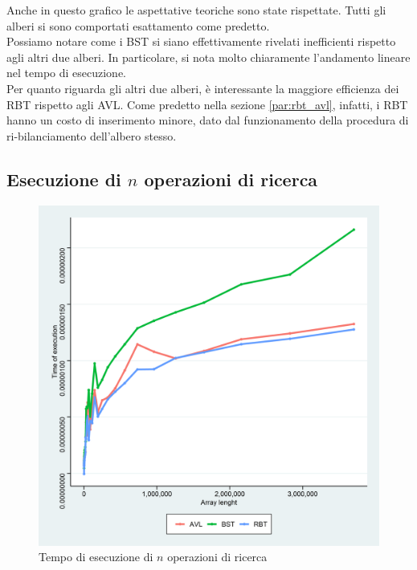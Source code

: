 \documentclass{article}
\begin{document}
	Anche in questo grafico le aspettative teoriche sono state rispettate. Tutti gli alberi si sono comportati esattamento come predetto. \\
	Possiamo notare come i BST si siano effettivamente rivelati inefficienti rispetto agli altri due alberi. In particolare, si nota molto chiaramente l'andamento lineare nel tempo di esecuzione. \\
	Per quanto riguarda gli altri due alberi, è interessante la maggiore efficienza dei RBT rispetto agli AVL. Come predetto nella sezione \ref{par:rbt_avl}, infatti, i RBT hanno un costo di inserimento minore, dato dal funzionamento della procedura di ri-bilanciamento dell'albero stesso.
	
	\newpage
	
	\subsection{Esecuzione di $n$ operazioni di ricerca}
	\label{subsection:n_op_ric}
		
	\begin{figure}[h!]
		\centering
  		\includegraphics[width=1 \columnwidth]{Grafici/Grafico_All_finds.png}
  		\caption{Tempo di esecuzione di $n$ operazioni di ricerca}
  		\label{fig:graph3}
	\end{figure}
	
\end{document}
